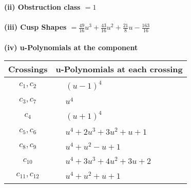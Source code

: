 \documentclass[1p]{elsarticle_modified}
\theoremstyle{definition}
\begin{document}
\flushleft \textbf{(ii) Obstruction class $= 1$}\\~\\
\flushleft \textbf{(iii) Cusp Shapes $= \frac{49}{16} u^3+\frac{43}{16} u^2+\frac{21}{8} u-\frac{163}{16}$}\\~\\
\newpage\renewcommand{\arraystretch}{1}
\flushleft \textbf{(iv) u-Polynomials at the component}\newline \\
\begin{tabular}{m{50pt}|m{274pt}}
Crossings & \hspace{64pt}u-Polynomials at each crossing \\
\hline $$\begin{aligned}c_{1},c_{2}\end{aligned}$$&$\begin{aligned}
&(u-1)^4
\end{aligned}$\\
\hline $$\begin{aligned}c_{3},c_{7}\end{aligned}$$&$\begin{aligned}
&u^4
\end{aligned}$\\
\hline $$\begin{aligned}c_{4}\end{aligned}$$&$\begin{aligned}
&(u+1)^4
\end{aligned}$\\
\hline $$\begin{aligned}c_{5},c_{6}\end{aligned}$$&$\begin{aligned}
&u^4+2 u^3+3 u^2+u+1
\end{aligned}$\\
\hline $$\begin{aligned}c_{8},c_{9}\end{aligned}$$&$\begin{aligned}
&u^4+u^2- u+1
\end{aligned}$\\
\hline $$\begin{aligned}c_{10}\end{aligned}$$&$\begin{aligned}
&u^4+3 u^3+4 u^2+3 u+2
\end{aligned}$\\
\hline $$\begin{aligned}c_{11},c_{12}\end{aligned}$$&$\begin{aligned}
&u^4+u^2+u+1
\end{aligned}$\\
\hline
\end{tabular}\\~\\
\end{document}
